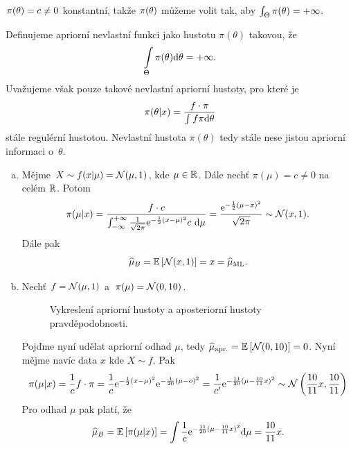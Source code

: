$\pi(\theta)=c\neq0$ konstantní, takže $\pi(\theta)$ můžeme volit tak, aby $\int_\Theta\pi(\theta)=+\infty$.
\begin{define} Definujeme apriorní nevlastní funkci jako hustotu $\pi(\theta)$ takovou, že $$ \int\limits_{\Theta}{\pi(\theta)\mathrm{d}\theta} = +\infty.$$  Uvažujeme však pouze takové nevlastní apriorní hustoty, pro které je 
	$$\pi(\theta|x)=\frac{f\cdot \pi}{\int f\pi\mathrm{d}\theta}$$ stále regulérní hustotou. Nevlastní hustota $\pi(\theta)$ tedy stále nese jistou apriorní informaci o~$\theta$.
\end{define}
\begin{example}\begin{enumerate}[a)]
		\item 
	Mějme $X\sim f(x|\mu)=\mathcal{N}(\mu,1)$, kde $\mu\in\mathbb{R}$. Dále nechť $\pi(\mu)=c\neq0$ na celém $\mathbb{R}$. Potom$$ \pi(\mu|x)=\frac{f\cdot c}{\int_{-\infty}^{+\infty}\frac{1}{\sqrt{2\pi}}\mathrm{e}^{-\frac{1}{2}(x-\mu)^2}c~\mathrm{d}\mu}=\frac{\mathrm{e}^{-\frac{1}{2}(\mu-x)^2}}{\sqrt{2\pi}}\sim\mathcal{N}(x,1).$$
	Dále pak 
	$$\widehat{\mu}_B=\mathbb{E}\left[ \mathcal{N}(x,1) \right]=x=\widehat{\mu}_{\mathrm{ML}}.$$
	\item Nechť $f=\mathcal{N}(\mu,1)$ a~$\pi(\mu)=\mathcal{N}(0,10)$.
	
\begin{figure}[h]
	\centering
	\caption{Vykreslení apriorní hustoty a aposteriorní hustoty pravděpodobnosti.}
\end{figure}
	

	
	Pojďme nyní udělat apriorní odhad $\mu$, tedy $\widehat{\mu}_{\mathrm{apr.}}=\mathbb{E}\left[ \mathcal{N}(0,10) \right]=0$. Nyní mějme navíc data $x$ kde $X\sim f$.  Pak
	$$ \pi(\mu|x)=\frac{1}{c}f\cdot\pi=\frac{1}{c}\mathrm{e}^{-\frac{1}{2}(x-\mu)^2}\mathrm{e}^{-\frac{1}{20}(\mu-o)^2}=\frac{1}{c'}\mathrm{e}^{-\frac{11}{20}(\mu-\frac{10}{11}x)^2}\sim \mathcal{N}\left(\frac{10}{11}x,\frac{10}{11}\right)$$ 
	Pro odhad $\mu$ pak platí, že
	$$\widehat{\mu}_B=\mathbb{E}\left[ \pi(\mu|x) \right]=\int\frac{1}{c}\mathrm{e}^{-\frac{11}{20}(\mu-\frac{10}{11}x)^2}\mathrm{d}\mu=\frac{10}{11}x.$$ 
		\end{enumerate}
\end{example}
